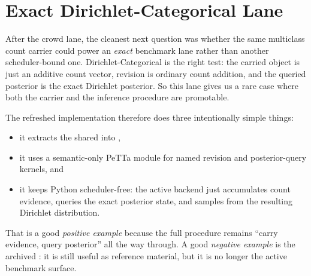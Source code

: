 \documentclass[11pt,openany]{report}
\begin{document}
\section{Exact Dirichlet-Categorical Lane}
\label{app:pplbench-dirichlet-categorical}

After the crowd lane, the cleanest next question was whether the same
multiclass count carrier could power an \emph{exact} benchmark lane rather
than another scheduler-bound one.  Dirichlet-Categorical is the right test:
the carried object is just an additive count vector, revision is ordinary
count addition, and the queried posterior is the exact Dirichlet posterior.
So this lane gives us a rare case where both the carrier and the inference
procedure are promotable.

The refreshed implementation therefore does three intentionally simple things:
\begin{itemize}
\item it extracts the shared  into
,
\item it uses a semantic-only PeTTa module
for named revision and posterior-query kernels, and
\item it keeps Python scheduler-free: the active backend
 just accumulates count
evidence, queries the exact posterior state, and samples from the resulting
Dirichlet distribution.
\end{itemize}

That is a good \emph{positive example} because the full procedure remains
``carry evidence, query posterior'' all the way through.  A good
\emph{negative example} is the archived
: it is still
useful as reference material, but it is no longer the active benchmark
surface.
\end{document}
